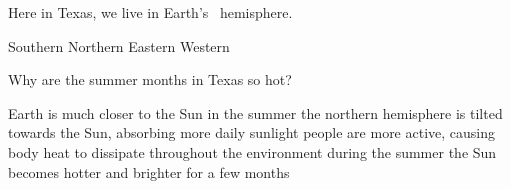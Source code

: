 \documentclass[addpoints]{exam}
\begin{document}
\begin{questions}



\question
Here in Texas, we live in Earth's \fillin\ hemisphere.

\begin{choices}
    \choice Southern
    \correctchoice Northern
    \choice Eastern
    \choice Western
\end{choices}

\question
Why are the summer months in Texas so hot?

\begin{choices}
    \choice Earth is much closer to the Sun in the summer
    \correctchoice the northern hemisphere is tilted towards the Sun, absorbing more daily sunlight
    \choice people are more active, causing body heat to dissipate throughout the environment
    \choice during the summer the Sun becomes hotter and brighter for a few months
\end{choices}









\end{questions}
\end{document}
